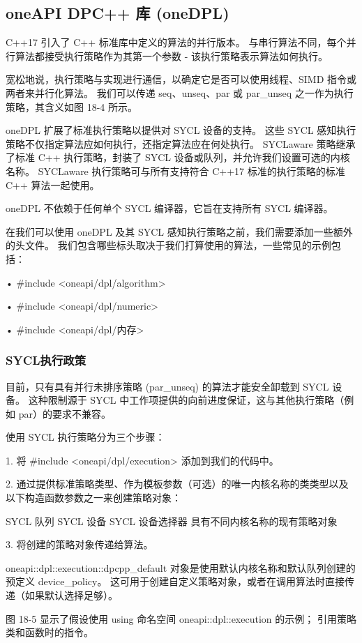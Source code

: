 \subsection{oneAPI DPC++ 库 (oneDPL)}
C++17 引入了 C++ 标准库中定义的算法的并行版本。 与串行算法不同，每个并行算法都接受执行策略作为其第一个参数 - 该执行策略表示算法如何执行。

宽松地说，执行策略与实现进行通信，以确定它是否可以使用线程、SIMD 指令或两者来并行化算法。 我们可以传递 seq、unseq、par 或 par\_unseq 之一作为执行策略，其含义如图 18-4 所示。

oneDPL 扩展了标准执行策略以提供对 SYCL 设备的支持。 这些 SYCL 感知执行策略不仅指定算法应如何执行，还指定算法应在何处执行。 SYCLaware 策略继承了标准 C++ 执行策略，封装了 SYCL 设备或队列，并允许我们设置可选的内核名称。 SYCLaware 执行策略可与所有支持符合 C++17 标准的执行策略的标准 C++ 算法一起使用。

oneDPL 不依赖于任何单个 SYCL 编译器，它旨在支持所有 SYCL 编译器。

在我们可以使用 oneDPL 及其 SYCL 感知执行策略之前，我们需要添加一些额外的头文件。 我们包含哪些标头取决于我们打算使用的算法，一些常见的示例包括：

• \#include <oneapi/dpl/algorithm>

• \#include <oneapi/dpl/numeric>

• \#include <oneapi/dpl/内存>

\subsubsection{SYCL执行政策}
目前，只有具有并行未排序策略 (par\_unseq) 的算法才能安全卸载到 SYCL 设备。 这种限制源于 SYCL 中工作项提供的向前进度保证，这与其他执行策略（例如 par）的要求不兼容。

使用 SYCL 执行策略分为三个步骤：

1. 将 \#include <oneapi/dpl/execution> 添加到我们的代码中。

2. 通过提供标准策略类型、作为模板参数（可选）的唯一内核名称的类类型以及以下构造函数参数之一来创建策略对象：

SYCL 队列 SYCL 设备 SYCL 设备选择器 具有不同内核名称的现有策略对象

3. 将创建的策略对象传递给算法。

oneapi::dpl::execution::dpcpp\_default 对象是使用默认内核名称和默认队列创建的预定义 device\_policy。 这可用于创建自定义策略对象，或者在调用算法时直接传递（如果默认选择足够）。

图 18-5 显示了假设使用 using 命名空间 oneapi::dpl::execution 的示例； 引用策略类和函数时的指令。

